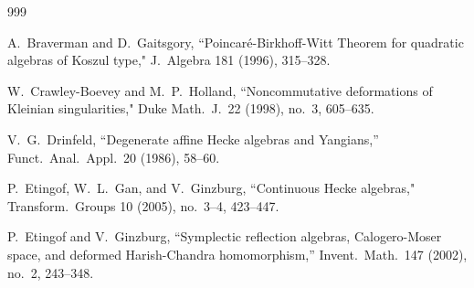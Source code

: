 \documentclass[11pt]{amsart}
\numberwithin{equation}{section}
\renewcommand{\_}[1]{\mbox{$_{\left( #1 \right)}$}}
\begin{document}
{\begin{thebibliography}{999}


  A.\ Braverman and D.\ Gaitsgory,
``Poincar\'e-Birkhoff-Witt Theorem for quadratic algebras of Koszul type,"
J.\ Algebra 181 (1996), 315--328. 







W.~Crawley-Boevey and M.~P.~Holland, ``Noncommutative deformations of
Kleinian singularities," Duke Math.~J.~22 (1998), no.~3, 605--635. 

 V.\ G.\ Drinfeld, ``Degenerate affine Hecke algebras
and Yangians,'' Funct.\ Anal.\ Appl.\ 20 (1986), 58--60. 

P.~Etingof, W.~L.~Gan, and V.~Ginzburg,
``Continuous Hecke algebras," Transform.~Groups 10 (2005), no.~3--4,
423--447. 

 P.\ Etingof and V.\ Ginzburg, 
``Symplectic reflection algebras, Calogero-Moser space, and deformed 
Harish-Chandra homomorphism,'' Invent.\ Math.\ 147 (2002), no.\ 2, 243--348. 




\end{thebibliography}}
\end{document}
